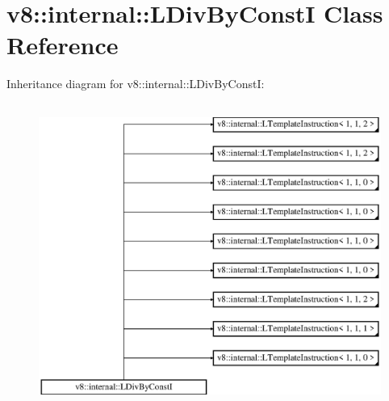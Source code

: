 \hypertarget{classv8_1_1internal_1_1_l_div_by_const_i}{}\section{v8\+:\+:internal\+:\+:L\+Div\+By\+ConstI Class Reference}
\label{classv8_1_1internal_1_1_l_div_by_const_i}
Inheritance diagram for v8\+:\+:internal\+:\+:L\+Div\+By\+ConstI\+:\begin{figure}[H]
\begin{center}
\leavevmode
\includegraphics[height=10.000000cm]{classv8_1_1internal_1_1_l_div_by_const_i}
\end{center}
\end{figure}

